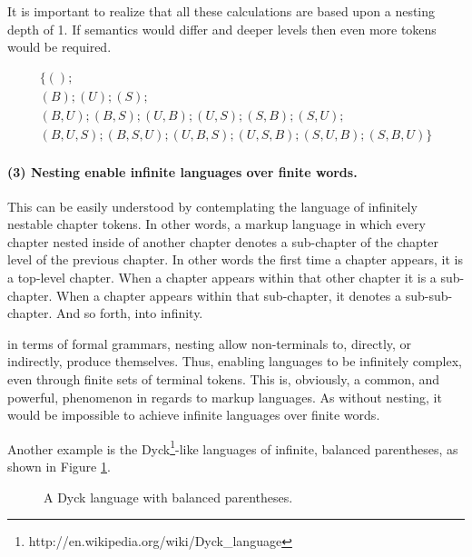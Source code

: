 \documentclass{scrreprt}
\begin{document}
It is important to realize that all these calculations are based upon a nesting depth of 1. If semantics would differ and deeper levels then even more tokens would be required.




\begin{equation}
\begin{split}
\{
(); \\
(B);
(U);
(S); \\
(B,U);
(B,S);
(U,B);
(U,S);
(S,B);
(S,U); \\
(B,U,S);
(B,S,U);
(U,B,S);
(U,S,B);
(S,U,B);
(S,B,U)
\}
\label{eq:all-tuples}
\end{split}
\end{equation}






\paragraph{(3) Nesting enable infinite languages over finite words.}
This can be easily understood by contemplating the language of infinitely nestable chapter tokens. In other words, a markup language in which every chapter nested inside of another chapter denotes a sub-chapter of the chapter level of the previous chapter. In other words the first time a chapter appears, it is a top-level chapter. When a chapter appears within that other chapter it is a sub-chapter. When a chapter appears within that sub-chapter, it denotes a sub-sub-chapter. And so forth, into infinity.

in terms of formal grammars, nesting allow non-terminals to, directly, or indirectly, produce themselves. Thus, enabling languages to be infinitely complex, even through finite sets of terminal tokens. This is, obviously, a common, and powerful, phenomenon in regards to markup languages. As without nesting, it would be impossible to achieve infinite languages over finite words.

Another example is the Dyck\footnote{ http://en.wikipedia.org/wiki/Dyck\_language}-like languages of infinite, balanced parentheses, as shown in Figure \ref{fig:mixed-content-nesting}.



\begin{figure}[h]
\centering
{}
\caption{A Dyck language with balanced parentheses.}
\label{fig:mixed-content-nesting}
\end{figure}
\end{document}
